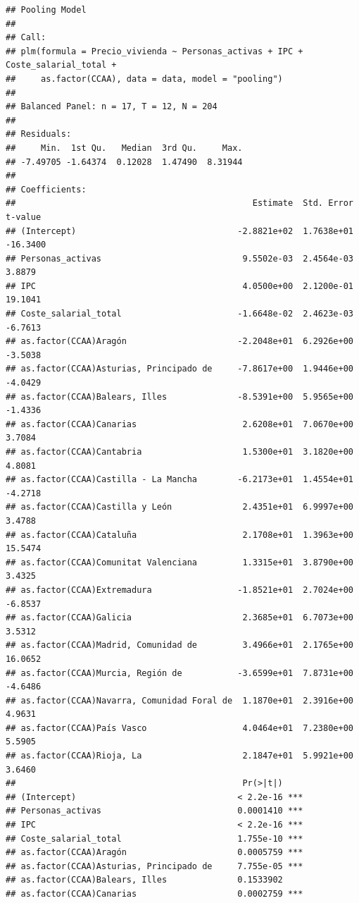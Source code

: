 \documentclass[
]{article}
\begin{document}
\begin{verbatim}
## Pooling Model
## 
## Call:
## plm(formula = Precio_vivienda ~ Personas_activas + IPC + Coste_salarial_total + 
##     as.factor(CCAA), data = data, model = "pooling")
## 
## Balanced Panel: n = 17, T = 12, N = 204
## 
## Residuals:
##     Min.  1st Qu.   Median  3rd Qu.     Max. 
## -7.49705 -1.64374  0.12028  1.47490  8.31944 
## 
## Coefficients:
##                                               Estimate  Std. Error  t-value
## (Intercept)                                -2.8821e+02  1.7638e+01 -16.3400
## Personas_activas                            9.5502e-03  2.4564e-03   3.8879
## IPC                                         4.0500e+00  2.1200e-01  19.1041
## Coste_salarial_total                       -1.6648e-02  2.4623e-03  -6.7613
## as.factor(CCAA)Aragón                      -2.2048e+01  6.2926e+00  -3.5038
## as.factor(CCAA)Asturias, Principado de     -7.8617e+00  1.9446e+00  -4.0429
## as.factor(CCAA)Balears, Illes              -8.5391e+00  5.9565e+00  -1.4336
## as.factor(CCAA)Canarias                     2.6208e+01  7.0670e+00   3.7084
## as.factor(CCAA)Cantabria                    1.5300e+01  3.1820e+00   4.8081
## as.factor(CCAA)Castilla - La Mancha        -6.2173e+01  1.4554e+01  -4.2718
## as.factor(CCAA)Castilla y León              2.4351e+01  6.9997e+00   3.4788
## as.factor(CCAA)Cataluña                     2.1708e+01  1.3963e+00  15.5474
## as.factor(CCAA)Comunitat Valenciana         1.3315e+01  3.8790e+00   3.4325
## as.factor(CCAA)Extremadura                 -1.8521e+01  2.7024e+00  -6.8537
## as.factor(CCAA)Galicia                      2.3685e+01  6.7073e+00   3.5312
## as.factor(CCAA)Madrid, Comunidad de         3.4966e+01  2.1765e+00  16.0652
## as.factor(CCAA)Murcia, Región de           -3.6599e+01  7.8731e+00  -4.6486
## as.factor(CCAA)Navarra, Comunidad Foral de  1.1870e+01  2.3916e+00   4.9631
## as.factor(CCAA)País Vasco                   4.0464e+01  7.2380e+00   5.5905
## as.factor(CCAA)Rioja, La                    2.1847e+01  5.9921e+00   3.6460
##                                             Pr(>|t|)    
## (Intercept)                                < 2.2e-16 ***
## Personas_activas                           0.0001410 ***
## IPC                                        < 2.2e-16 ***
## Coste_salarial_total                       1.755e-10 ***
## as.factor(CCAA)Aragón                      0.0005759 ***
## as.factor(CCAA)Asturias, Principado de     7.755e-05 ***
## as.factor(CCAA)Balears, Illes              0.1533902    
## as.factor(CCAA)Canarias                    0.0002759 ***

\end{verbatim}
\end{document}
